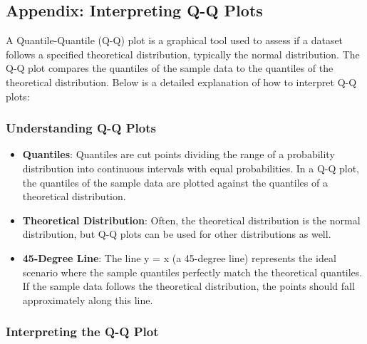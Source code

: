 \subsection{Appendix: Interpreting Q-Q Plots}

A Quantile-Quantile (Q-Q) plot is a graphical tool used to assess if a dataset follows a specified theoretical distribution, typically the normal distribution. The Q-Q plot compares the quantiles of the sample data to the quantiles of the theoretical distribution. Below is a detailed explanation of how to interpret Q-Q plots:

\subsubsection{Understanding Q-Q Plots}

\begin{itemize}
    \item \textbf{Quantiles}: Quantiles are cut points dividing the range of a probability distribution into continuous intervals with equal probabilities. In a Q-Q plot, the quantiles of the sample data are plotted against the quantiles of a theoretical distribution.
    \item \textbf{Theoretical Distribution}: Often, the theoretical distribution is the normal distribution, but Q-Q plots can be used for other distributions as well.
    \item \textbf{45-Degree Line}: The line y = x (a 45-degree line) represents the ideal scenario where the sample quantiles perfectly match the theoretical quantiles. If the sample data follows the theoretical distribution, the points should fall approximately along this line.
\end{itemize}

\subsubsection{Interpreting the Q-Q Plot}


